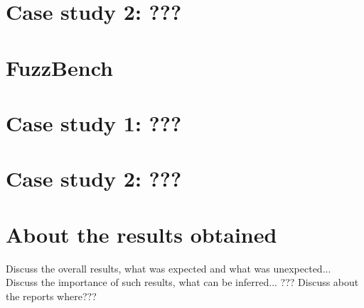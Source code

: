 \newpage
\section{Case study 2: ???}


\newpage
\section{FuzzBench}


\newpage
\section{Case study 1: ???}


\newpage
\section{Case study 2: ???}


\newpage
\section{About the results obtained}
Discuss the overall results, what was expected and what was unexpected...
\newline \newline
Discuss the importance of such results, what can be inferred...
\newline \newline
??? Discuss about the reports  where???
